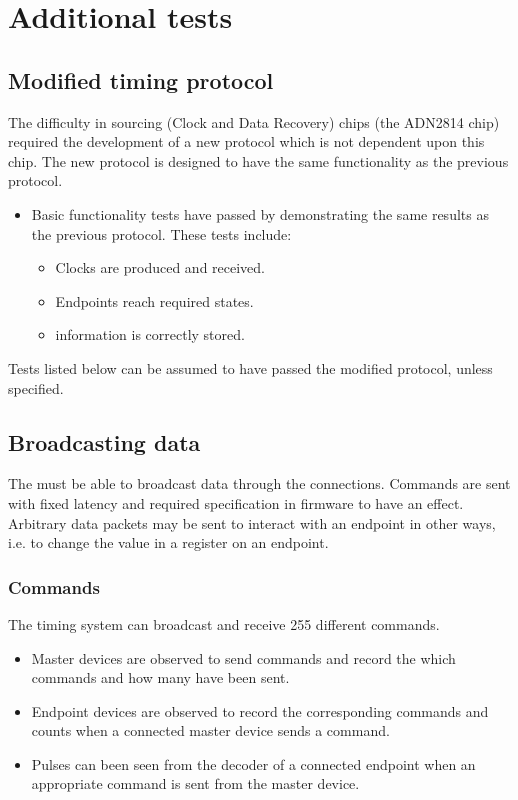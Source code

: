 \documentclass{dune}
\begin{document}
\section{Additional tests}

\subsection{Modified timing protocol}
\label{sec:new-protocol}
The difficulty in sourcing  (Clock and Data Recovery) chips (the ADN2814 chip) required the development of a new protocol which is not dependent upon this chip.
The new protocol is designed to have the same functionality as the previous protocol.
\begin{itemize}
  \item Basic functionality tests have passed by demonstrating the same results as the previous protocol.
  These tests include:
  \begin{itemize}
  	\item Clocks are produced and received.
  	\item Endpoints reach required states.
  	\item {} information is correctly stored.
  \end{itemize}
\end{itemize}
Tests listed below can be assumed to have passed the modified protocol, unless specified.

\subsection{Broadcasting data}
The  must be able to broadcast data through the  connections.
Commands are sent with fixed latency and required specification in firmware to have an effect.
Arbitrary data packets may be sent to interact with an endpoint in other ways, i.e. to change the value in a register on an endpoint.

\subsubsection{Commands}
The timing system can broadcast and receive 255 different commands.
\begin{itemize}
  \item Master devices are observed to send commands and record the which commands and how many have been sent.
  \item Endpoint devices are observed to record the corresponding commands and counts when a connected master device sends a command.
  \item Pulses can been seen from the decoder of a connected endpoint when an appropriate command is sent from the master device.
\end{itemize}
\end{document}
